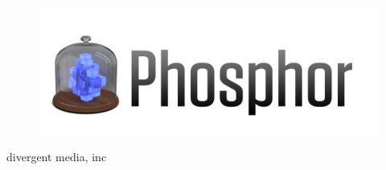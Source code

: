 
\thispagestyle{empty} %



\begin{figure}[H]
\hspace{0.5cm}
\includegraphics[scale = 0.2,left]{images/Phosphor-Logo-Large.png}
\end{figure}


	



\vfill %


{
\begin{figure}[H]
\end{figure}


\vspace*{-0.7cm}
\hfill\small divergent media, inc \\

} %


\clearpage %
